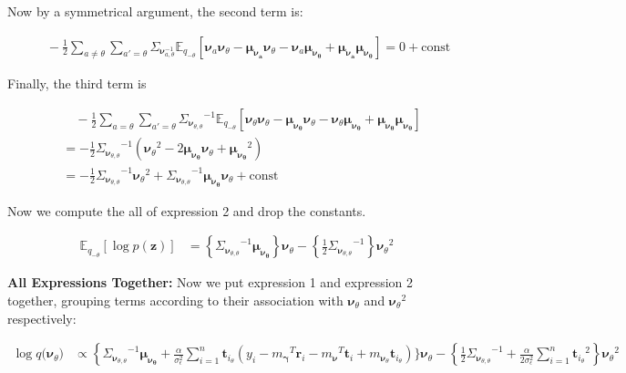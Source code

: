 \documentclass[letterpaper,12pt]{article}
\newcommand{\lc}{\left \{} %
\newcommand{\rc}{\right \}} %
\newcommand{\lp}{\left (} %
\newcommand{\rp}{\right )} %
\newcommand{\lb}{\left [} %
\newcommand{\rb}{\right ]} %
\newcommand{\pz}{\ensuremath{p(\boldsymbol{z})}}
\newcommand{\sigmaepsilon}{\sigma_\epsilon^2} %
\newcommand{\nuv}{\boldsymbol{\nu}} %
\newcommand{\gammav}{\boldsymbol{\gamma}} %
\newcommand{\ti}{\boldsymbol{t}_i} %
\newcommand{\ri}{\boldsymbol{r}_i} %
\newcommand{\Sigmanu}{\Sigma_{\nuv}} %
\newcommand{\mnu}{\ensuremath{m_\nuv}} %
\newcommand{\mgamma}{m_\gammav} %
\newcommand{\qtheta}{\ensuremath{q(\boldsymbol{\nu}_\theta})}
\newcommand{\nua}{\ensuremath{\nuv_a}} %
\newcommand{\meananu}{\ensuremath{\boldsymbol{\mu_{\nuv_a}}}} %
\newcommand{\tthetatilde}{\ensuremath{\boldsymbol{t}_{i_\theta}}} %
\newcommand{\nutheta}{\ensuremath{\nuv_\theta}} %
\newcommand{\meannutheta}{\ensuremath{\boldsymbol{\mu_{\nuv_\theta}}}} %
\newcommand{\sigmanutheta}{\ensuremath{\Sigma_{\nuv_{\theta, \theta}}}}
\newcommand{\mnusub}[1]{\ensuremath{m_{\nuv_#1}}} %
\newcommand{\Etheta}{\ensuremath{\mathbb{E}_{q_{-\theta}}}} %
\newcommand{\el}{\left[} %
\newcommand{\er}{\right]} %
\begin{document}
Now by a symmetrical argument, the second term is:

\begin{equation}
\begin{split}
    & \quad - \frac{1}{2} \sum_{a \neq \theta} \sum_{a' = \theta}  \Sigmanu_{a,\theta}^{-1} \Etheta  \lb \nua \nutheta - \meananu\nutheta - \nua \meannutheta + \meananu \meannutheta \rb = 0 + \textrm{const}
\end{split}
\end{equation}

Finally, the third term is

\begin{equation}
\begin{split}
    & \quad - \frac{1}{2} \sum_{a=\theta} \sum_{a' = \theta}  \sigmanutheta^{-1} \Etheta  \lb \nutheta \nutheta - \meannutheta \nutheta - \nutheta \meannutheta + \meannutheta \meannutheta \rb \\
    &=  - \frac{1}{2}  \sigmanutheta^{-1} \lp \nutheta^2 - 2 \meannutheta \nutheta + \meannutheta^2 \rp \\
    &= - \frac{1}{2}  \sigmanutheta^{-1} \nutheta^2 + \sigmanutheta^{-1} \meannutheta \nutheta + \text{const}
\end{split}
\end{equation}

Now we compute the all of expression 2 and drop the constants.

\begin{equation}
\begin{split}
   \Etheta \el \log \pz \er &= \lc \sigmanutheta^{-1} \meannutheta \rc \nutheta - \lc \frac{1}{2} \sigmanutheta^{-1} \rc \nutheta^2
\end{split}
\end{equation}

\noindent \textbf{All Expressions Together:} Now we put expression 1 and expression 2 together, grouping terms according to their association with $\nutheta$ and $\nutheta^2$ respectively:

\begin{equation}
\begin{split}
    \log \qtheta &\propto \lc \sigmanutheta^{-1} \meannutheta + \frac{\alpha}{ \sigmaepsilon} \sum_{i=1}^n \tthetatilde \lp y_i - {\mgamma}^T \ri - {\mnu}^T \ti + \mnusub{\theta} \tthetatilde \rp \Bigg\} \nutheta - \lc \frac{1}{2} \sigmanutheta^{-1} + \frac{\alpha}{2 \sigmaepsilon} \sum_{i=1}^n  \tthetatilde^2 \rc \nutheta^2
\end{split}
\end{equation}
\end{document}

